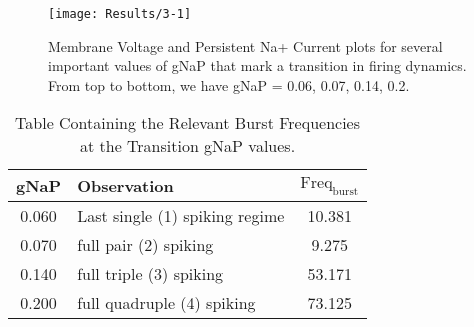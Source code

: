\documentclass[12pt]{article}
\begin{document}


\begin{figure}[H]
\centering
\texttt{[image: Results/3-1]}
\caption{\label{Fig:3a1} Membrane Voltage and Persistent Na+ Current plots for several important values of gNaP that mark a transition in firing dynamics. From top to bottom, we have gNaP = {0.06, 0.07, 0.14, 0.2}. }
\end{figure}


\begin{table}[H]                
\centering                   
\begin{tabular}{|c|l|c|}       
\hline                       
gNaP & Observation & $\text{Freq}_{\text{burst}}$ \\
\hline                       
0.060 & Last single (1) spiking regime & 10.381 \\            
\hline                       
0.070 & full pair (2) spiking & 9.275 \\             
\hline                       
0.140 & full triple (3) spiking & 53.171 \\            
\hline                       
0.200 & full quadruple (4) spiking & 73.125 \\            
\hline                       
\end{tabular}                
\caption{Table Containing the Relevant Burst Frequencies at the Transition gNaP values.}     
\label{table:3}   
\end{table}                  




\end{document}
